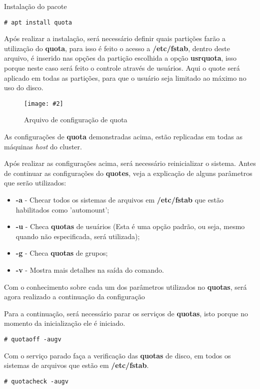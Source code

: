 \documentclass[
	12pt,				%
	openany,			%
	a4paper,			%
	chapter=TITLE,		%
	section=TITLE,		%
	english,
	brazil				%
]{abntex2}
\newcommand{\includeImage}[3] {

\begin{figure}[H]
 	 \centering
  		\texttt{[image: \#2]}
  	\caption{#3}
\end{figure}

}
\begin{document}
Instalação do pacote
\begin{lstlisting}
# apt install quota
\end{lstlisting}

Após realizar a instalação, será necessário definir quais partições farão a utilização do \textbf{quota}, para isso é feito o acesso a \textbf{/etc/fstab}, dentro deste arquivo, é inserido nas opções da partição escolhida a opção \textbf{usrquota}, isso porque neste caso será feito o controle através de usuários. Aqui o quote será aplicado em todas as partições, para que o usuário seja limitado ao máximo no uso do disco.

\includeImage{0.7}{imgs/3_configuracao_quota/1.png}{Arquivo de configuração de quota}

As configurações de \textbf{quota} demonstradas acima, estão replicadas em todas as máquinas \textit{host} do cluster. 

Após realizar as configurações acima, será necessário reinicializar o sistema. Antes de continuar as configurações do \textbf{quotes}, veja a explicação de alguns parâmetros que serão utilizados:
\begin{itemize}
	\item \textbf{-a} - Checar todos os sistemas de arquivos em \textbf{/etc/fstab} que estão habilitados como 'automount';
	\item \textbf{-u} - Checa \textbf{quotas} de usuários (Esta é uma opção padrão, ou seja, mesmo quando não especificada, será utilizada);
	\item \textbf{-g} - Checa \textbf{quotas} de grupos;
	\item \textbf{-v} - Mostra mais detalhes na saída do comando.
\end{itemize}

Com o conhecimento sobre cada um dos parâmetros utilizados no \textbf{quotas}, será agora realizado a continuação da configuração

Para a continuação, será necessário parar os serviços de \textbf{quotas}, isto porque no momento da inicialização ele é iniciado.
\begin{lstlisting}
# quotaoff -augv 
\end{lstlisting}

Com o serviço parado faça a verificação das \textbf{quotas} de disco, em todos os sistemas de arquivos que estão em \textbf{/etc/fstab}.
\begin{lstlisting}
# quotacheck -augv
\end{lstlisting}
\end{document}
